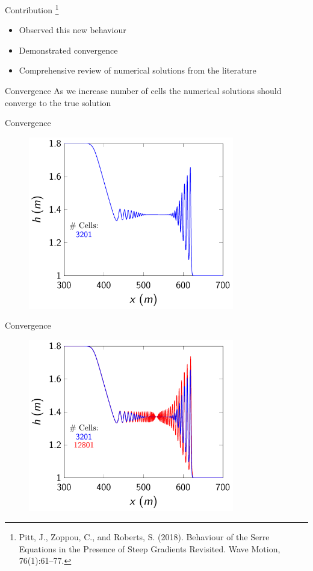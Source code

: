 \documentclass[]{beamer}
\newcommand\blfootnote[1]{%
	\begingroup
	\renewcommand\thefootnote{}\footnote{#1}%
	\addtocounter{footnote}{-1}%
	\endgroup
}
\begin{document}
\begin{frame}{Contribution}
	\blfootnote{Pitt, J., Zoppou, C., and Roberts, S. (2018).
		Behaviour of the Serre Equations in the Presence of Steep
		Gradients Revisited.
		Wave Motion, 76(1):61–77.}
	\begin{itemize}
		\item Observed this new behaviour
		\item Demonstrated convergence
		\item Comprehensive review of numerical solutions from the literature
	\end{itemize}
	
\end{frame}

\begin{frame}{Convergence}
As we increase number of cells the numerical solutions should converge to the true solution
\end{frame}
\begin{frame}{Convergence}
		\begin{figure}
			\includegraphics[width=0.8\textwidth]{./Pics/SteepGradients/h0.pdf}
		\end{figure}
\end{frame}
\begin{frame}{Convergence}
		\begin{figure}
			\includegraphics[width=0.8\textwidth]{./Pics/SteepGradients/h01.pdf}
		\end{figure}
\end{frame}
\end{document}
